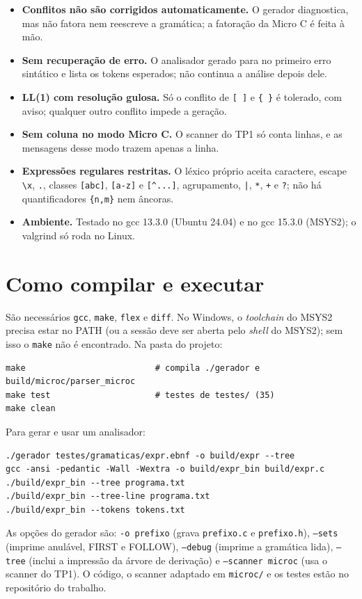 \documentclass[11pt,a4paper]{article}
\begin{document}
\begin{itemize}
\item \textbf{Conflitos não são corrigidos automaticamente.} O gerador diagnostica, mas não
  fatora nem reescreve a gramática; a fatoração da Micro C é feita à mão.
\item \textbf{Sem recuperação de erro.} O analisador gerado para no primeiro erro sintático e
  lista os tokens esperados; não continua a análise depois dele.
\item \textbf{LL(1) com resolução gulosa.} Só o conflito de \texttt{[ ]} e \texttt{\{ \}} é
  tolerado, com aviso; qualquer outro conflito impede a geração.
\item \textbf{Sem coluna no modo Micro C.} O scanner do TP1 só conta linhas, e as mensagens desse
  modo trazem apenas a linha.
\item \textbf{Expressões regulares restritas.} O léxico próprio aceita caractere, escape
  \texttt{\textbackslash x}, \texttt{.}, classes \texttt{[abc]}, \texttt{[a-z]} e \texttt{[\^{}...]},
  agrupamento, \texttt{|}, \texttt{*}, \texttt{+} e \texttt{?}; não há quantificadores
  \texttt{\{n,m\}} nem âncoras.
\item \textbf{Ambiente.} Testado no gcc 13.3.0 (Ubuntu 24.04) e no gcc 15.3.0 (MSYS2); o valgrind
  só roda no Linux.
\end{itemize}

\section{Como compilar e executar}

São necessários \texttt{gcc}, \texttt{make}, \texttt{flex} e \texttt{diff}. No Windows, o
\emph{toolchain} do MSYS2 precisa estar no PATH (ou a sessão deve ser aberta pelo \emph{shell}
do MSYS2); sem isso o \texttt{make} não é encontrado. Na pasta do projeto:

\begin{lstlisting}
make                          # compila ./gerador e build/microc/parser_microc
make test                     # testes de testes/ (35)
make clean
\end{lstlisting}

Para gerar e usar um analisador:

\begin{lstlisting}
./gerador testes/gramaticas/expr.ebnf -o build/expr --tree
gcc -ansi -pedantic -Wall -Wextra -o build/expr_bin build/expr.c
./build/expr_bin --tree programa.txt
./build/expr_bin --tree-line programa.txt
./build/expr_bin --tokens tokens.txt
\end{lstlisting}

As opções do gerador são: \texttt{-o prefixo} (grava \texttt{prefixo.c} e \texttt{prefixo.h}),
\texttt{--sets} (imprime anulável, FIRST e FOLLOW), \texttt{--debug} (imprime a gramática lida),
\texttt{--tree} (inclui a impressão da árvore de derivação) e \texttt{--scanner microc} (usa o
scanner do TP1). O código, o scanner adaptado em \texttt{microc/} e os testes estão no
repositório do trabalho.
\end{document}
